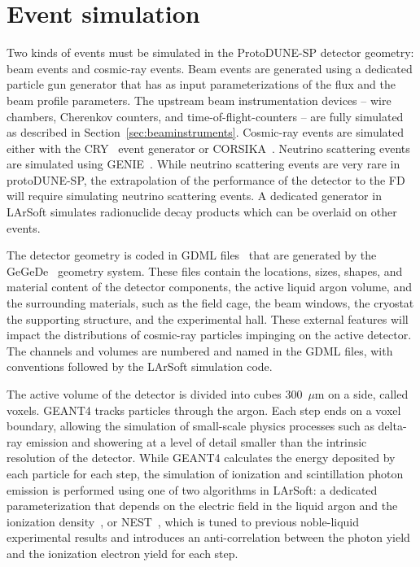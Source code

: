 \section{Event simulation}
\label{sec:larsoftsim}

Two kinds of events must be simulated in the ProtoDUNE-SP detector
geometry: beam events and cosmic-ray events.  Beam events are
generated using a dedicated particle gun generator that has as input
parameterizations of the flux and the beam profile parameters.
The upstream beam instrumentation devices -- wire chambers, Cherenkov
counters, and time-of-flight-counters -- are fully simulated as described in
Section~\ref{sec:beaminstruments}. Cosmic-ray
events are simulated either with the CRY~\cite{cry, cry2} event generator or
CORSIKA~\cite{Heck:1998vt}.  Neutrino scattering events are simulated
using GENIE~\cite{Andreopoulos:2009rq}.  While neutrino scattering events are very
rare in protoDUNE-SP, the extrapolation of the performance of
the detector to the FD will require simulating neutrino scattering
events.  A dedicated generator in LArSoft simulates
radionuclide decay products which can be overlaid on other events.

The detector geometry is coded in GDML files~\cite{Agostinelli:2002hh} that are
generated by the GeGeDe~\cite{gegede} 
geometry system.  These files
contain the locations, sizes, shapes, and material content of the
detector components, the active liquid argon volume, and the
surrounding materials, such as the field cage, the beam windows, the
cryostat the supporting structure, and the experimental hall.  These
external features will impact the distributions of cosmic-ray
particles impinging on the active detector.  The channels and volumes
are numbered and named in the GDML files, with conventions followed by
the LArSoft simulation code.

The active volume of the detector is divided into cubes 300~$\mu$m on
a side, called voxels.  GEANT4 tracks particles through the argon.
Each step ends on a voxel boundary, allowing the simulation of small-scale
physics processes such as delta-ray emission and showering at a level
of detail smaller than the intrinsic resolution of the detector.   While GEANT4
calculates the energy deposited by each particle for each step, the
simulation of ionization and scintillation photon emission 
is performed using one of two algorithms in LArSoft:  a dedicated parameterization that
depends on the electric field in the liquid argon and the ionization
density~\cite{Birks:1964zz}, or  NEST~\cite{Szydagis:2011tk}, which is tuned to
previous noble-liquid experimental results and introduces an
anti-correlation between the photon yield and the ionization electron
yield for each step.  

